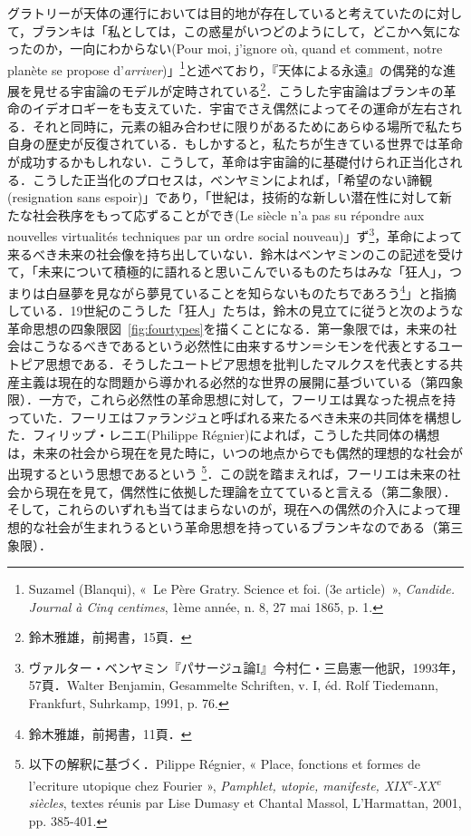 グラトリーが天体の運行においては目的地が存在していると考えていたのに対して，ブランキは「私としては，この惑星がいつどのようにして，どこかへ気になったのか，一向にわからない(Pour moi, j'ignore où, quand et comment, notre planète se propose d'\emph{arriver})」\footnote{Suzamel (Blanqui), «~Le Père Gratry. Science et foi. (3e article)~», \emph{Candide. Journal à Cinq centimes}, 1ème année, n. 8, 27 mai 1865, p. 1.}と述べており，『天体による永遠』の偶発的な進展を見せる宇宙論のモデルが定時されている\footnote{鈴木雅雄，前掲書，15頁．}．こうした宇宙論はブランキの革命のイデオロギーをも支えていた．宇宙でさえ偶然によってその運命が左右される．それと同時に，元素の組み合わせに限りがあるためにあらゆる場所で私たち自身の歴史が反復されている．もしかすると，私たちが生きている世界では革命が成功するかもしれない．こうして，革命は宇宙論的に基礎付けられ正当化される．こうした正当化のプロセスは，ベンヤミンによれば，「希望のない諦観(resignation sans espoir)」であり，「世紀は，技術的な新しい潜在性に対して新たな社会秩序をもって応ずることができ(Le siècle n'a pas su répondre aux nouvelles virtualités techniques par un ordre social nouveau)」ず\footnote{ヴァルター・ベンヤミン『パサージュ論I』今村仁・三島憲一他訳，1993年，57頁．Walter Benjamin, Gesammelte Schriften, v. I, éd. Rolf Tiedemann, Frankfurt, Suhrkamp, 1991, p. 76.}，革命によって来るべき未来の社会像を持ち出していない．鈴木はベンヤミンのこの記述を受けて，「未来について積極的に語れると思いこんでいるものたちはみな「狂人」，つまりは白昼夢を見ながら夢見ていることを知らないものたちであろう\footnote{鈴木雅雄，前掲書，11頁．}」と指摘している．19世紀のこうした「狂人」たちは，鈴木の見立てに従うと次のような革命思想の四象限図~\ref{fig:fourtypes}を描くことになる．第一象限では，未来の社会はこうなるべきであるという必然性に由来するサン＝シモンを代表とするユートピア思想である．そうしたユートピア思想を批判したマルクスを代表とする共産主義は現在的な問題から導かれる必然的な世界の展開に基づいている（第四象限）．一方で，これら必然性の革命思想に対して，フーリエは異なった視点を持っていた．フーリエはファランジュと呼ばれる来たるべき未来の共同体を構想した．フィリップ・レニエ(Philippe Régnier)によれば，こうした共同体の構想は，未来の社会から現在を見た時に，いつの地点からでも偶然的理想的な社会が出現するという思想であるという
\footnote{以下の解釈に基づく．Pilippe Régnier, « Place, fonctions et formes de l'ecriture utopique chez Fourier », \emph{Pamphlet, utopie, manifeste, XIX\textsuperscript{e}-XX\textsuperscript{e} siècles}, textes réunis par Lise Dumasy et Chantal Massol, L'Harmattan, 2001, pp. 385-401.}．この説を踏まえれば，フーリエは未来の社会から現在を見て，偶然性に依拠した理論を立てていると言える（第二象限）．そして，これらのいずれも当てはまらないのが，現在への偶然の介入によって理想的な社会が生まれうるという革命思想を持っているブランキなのである（第三象限）．


